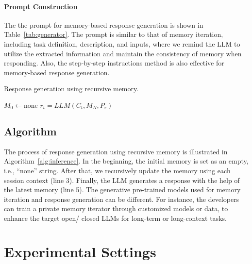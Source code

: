 \documentclass[authoryear,preprint,review,12pt]{elsarticle}
\begin{document}
\paragraph*{Prompt Construction} The the prompt for memory-based response generation is shown in Table~\ref{tab:generator}. The prompt is similar to that of memory iteration, including task definition, description, and inputs, where we remind the LLM to utilize the extracted information and maintain the consistency of memory when responding. Also, the step-by-step instructions method is also effective for memory-based response generation.



\begin{algorithm}[t]
\caption{Response generation using recursive memory.}
\label{alg:inference}
$M_0 \leftarrow \text{none}$\;
 $r_t=LLM(C_t, M_N, P_r)$\;
\end{algorithm}
\subsection{Algorithm}
The process of response generation using recursive memory is illustrated in Algorithm~\ref{alg:inference}. In the beginning, the initial memory is set as an empty, i.e., ``none'' string. After that, we recursively update the memory using each session context (line 3). Finally, the LLM generates a response with the help of the latest memory (line 5). The generative pre-trained models used for memory iteration and response generation can be different. For instance, the developers can train a private memory iterator through customized models or data, to enhance the target open/ closed LLMs for long-term or long-context tasks.

\section{Experimental Settings}
\end{document}
